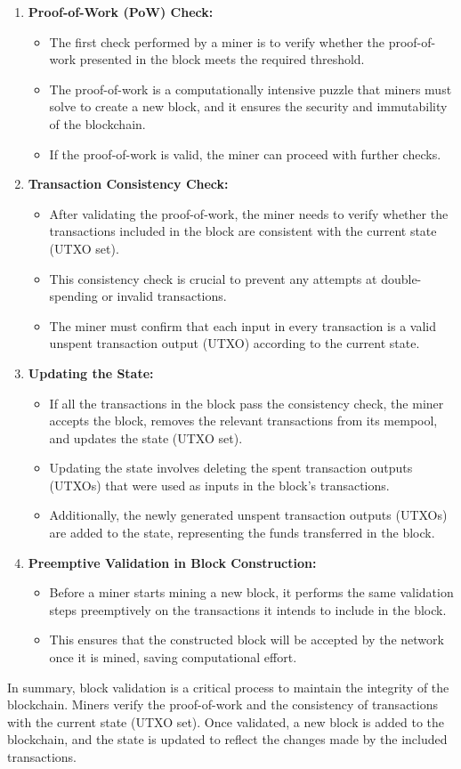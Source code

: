 \documentclass{report}
\begin{document}
\begin{enumerate}
	\item \textbf{Proof-of-Work (PoW) Check:}
	\begin{itemize}
		\item The first check performed by a miner is to verify whether the proof-of-work presented in the block meets the required threshold.
		\item The proof-of-work is a computationally intensive puzzle that miners must solve to create a new block, and it ensures the security and immutability of the blockchain.
		\item If the proof-of-work is valid, the miner can proceed with further checks.
	\end{itemize}
	\item \textbf{Transaction Consistency Check:}
	\begin{itemize}
		\item After validating the proof-of-work, the miner needs to verify whether the transactions included in the block are consistent with the current state (UTXO set).
		\item This consistency check is crucial to prevent any attempts at double-spending or invalid transactions.
		\item The miner must confirm that each input in every transaction is a valid unspent transaction output (UTXO) according to the current state.
	\end{itemize}
	\item \textbf{Updating the State:}
	\begin{itemize}
		\item If all the transactions in the block pass the consistency check, the miner accepts the block, removes the relevant transactions from its mempool, and updates the state (UTXO set).
		\item Updating the state involves deleting the spent transaction outputs (UTXOs) that were used as inputs in the block's transactions.
		\item Additionally, the newly generated unspent transaction outputs (UTXOs) are added to the state, representing the funds transferred in the block.
	\end{itemize}
	\item \textbf{Preemptive Validation in Block Construction:}
	\begin{itemize}
		\item Before a miner starts mining a new block, it performs the same validation steps preemptively on the transactions it intends to include in the block.
		\item This ensures that the constructed block will be accepted by the network once it is mined, saving computational effort.
	\end{itemize}
\end{enumerate}
In summary, block validation is a critical process to maintain the integrity of the blockchain. Miners verify the proof-of-work and the consistency of transactions with the current state (UTXO set). Once validated, a new block is added to the blockchain, and the state is updated to reflect the changes made by the included transactions.
\end{document}
